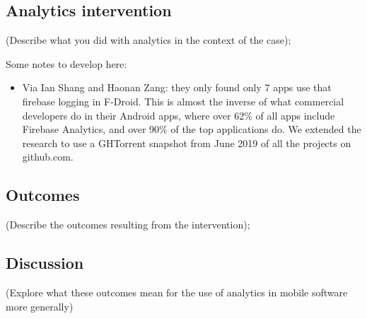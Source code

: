 \subsection{Analytics intervention}
(Describe what you did with analytics in the context of the case); 

Some notes to develop here:
\begin{itemize}
    \item Via Ian Shang and Haonan Zang: they only found only 7 apps use that firebase logging in F-Droid. This is almost the inverse of what commercial developers do in their Android apps, where over 62\% of all apps include Firebase Analytics, and over 90\% of the top applications do. We extended the research to use a GHTorrent snapshot from  June 2019 of all the projects on github.com.

\end{itemize}

\subsection{Outcomes} 
(Describe the outcomes resulting from the intervention); 

\subsection{Discussion} 
(Explore what these outcomes mean for the use of analytics in mobile software more generally)

